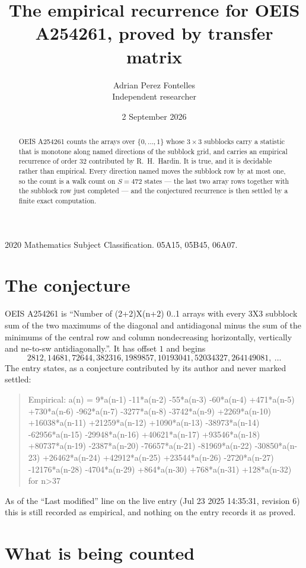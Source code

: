 \documentclass[11pt,a4paper]{article}
\title{The empirical recurrence for OEIS A254261, proved by transfer matrix}
\author{Adrian Perez Fontelles\\ \small Independent researcher}
\date{2 September 2026}
\theoremstyle{plain}
\theoremstyle{definition}
\begin{document}
\maketitle

\begin{abstract}
OEIS A254261 counts the arrays over $\{0,\dots,1\}$ whose $3\times3$ subblocks carry a
statistic that is monotone along named directions of the subblock grid, and carries an
empirical recurrence of order $32$ contributed by R.~H.~Hardin. It is true, and it is
decidable rather than empirical. Every direction named moves the subblock row by at most one,
so the count is a walk count on $S=472$ states --- the last two array rows together with the
subblock row just completed --- and the conjectured recurrence is then settled by a finite
exact computation.
\end{abstract}

\noindent\small 2020 Mathematics Subject Classification. 05A15, 05B45, 06A07.\normalsize

\section{The conjecture}

OEIS A254261 is ``Number of (2+2)X(n+2) 0..1 arrays with every 3X3 subblock sum of the two maximums of the diagonal and antidiagonal minus the sum of the minimums of the central row and column nondecreasing horizontally, vertically and ne-to-sw antidiagonally.''. It has offset $1$ and begins
\[
2812, 14681, 72644, 382316, 1989857, 10193041, 52034327, 264149081,\ \dots
\]
The entry states, as a conjecture contributed by its author and never marked settled:
\begin{quote}
Empirical: a(n) = 9*a(n-1) -11*a(n-2) -55*a(n-3) -60*a(n-4) +471*a(n-5) +730*a(n-6) -962*a(n-7) -3277*a(n-8) -3742*a(n-9) +2269*a(n-10) +16038*a(n-11) +21259*a(n-12) +1090*a(n-13) -38973*a(n-14) -62956*a(n-15) -29948*a(n-16) +40621*a(n-17) +93546*a(n-18) +80737*a(n-19) -2387*a(n-20) -76657*a(n-21) -81969*a(n-22) -30850*a(n-23) +26462*a(n-24) +42912*a(n-25) +23544*a(n-26) -2720*a(n-27) -12176*a(n-28) -4704*a(n-29) +864*a(n-30) +768*a(n-31) +128*a(n-32) for n>37
\end{quote}
As of the ``Last modified'' line on the live entry (Jul 23 2025 14:35:31, revision 6) this is still
recorded as empirical, and nothing on the entry records it as proved.

\section{What is being counted}
\end{document}
